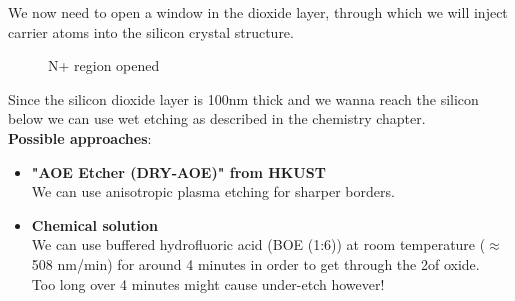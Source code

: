 We now need to open a window in the dioxide layer, through which we will inject carrier atoms into the silicon crystal structure.

\begin{figure}[H]
	\centering
	\begin{tikzpicture}[node distance = 3cm, auto, thick,scale=\CrossAndTopSection, every node/.style={transform shape}]
		
	\end{tikzpicture}
	\begin{tikzpicture}[node distance = 3cm, auto, thick,scale=\CrossAndTopSection, every node/.style={transform shape}]
		
	\end{tikzpicture}
	\drawStepArrow{}
	\begin{tikzpicture}[node distance = 3cm, auto, thick,scale=\CrossAndTopSection, every node/.style={transform shape}]
		
	\end{tikzpicture}
	\begin{tikzpicture}[node distance = 3cm, auto, thick,scale=\CrossAndTopSection, every node/.style={transform shape}]
		
	\end{tikzpicture}
	\caption{N+ region opened}
\end{figure}

Since the silicon dioxide layer is 100nm thick and we wanna reach the silicon below we can use wet etching as described in the chemistry chapter.\\

\textbf{Possible approaches}:
\begin{itemize}
	\item \textbf{"AOE Etcher (DRY-AOE)" from HKUST} \\
	We can use anisotropic plasma etching for sharper borders.
	\item \textbf{Chemical solution} \\
	We can use buffered hydrofluoric acid (BOE (1:6)) at room temperature ($\approx$508 nm/min) for around 4 minutes in order to get through the 2\um of oxide.\\
	Too long over 4 minutes might cause under-etch however!
\end{itemize}
